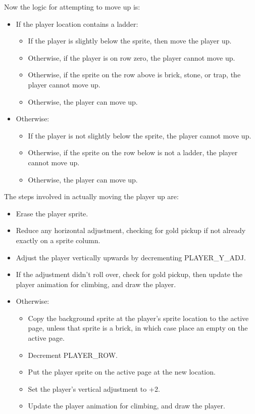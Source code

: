 \documentclass[10pt]{report}
\begin{document}
Now the logic for attempting to move up is:

\begin{itemize}
  \item If the player location contains a ladder:
  \begin{itemize}
    \item If the player is slightly below the sprite, then move the player up.
    \item Otherwise, if the player is on row zero, the player cannot move up.
    \item Otherwise, if the sprite on the row above is brick, stone, or trap,
          the player cannot move up.
    \item Otherwise, the player can move up.
  \end{itemize}
  \item Otherwise:
  \begin{itemize}
    \item If the player is not slightly below the sprite, the player cannot move up.
    \item Otherwise, if the sprite on the row below is not a ladder, the player cannot move up.
    \item Otherwise, the player can move up.
  \end{itemize}
\end{itemize}

The steps involved in actually moving the player up are:

\begin{itemize}
    \item Erase the player sprite.
    \item Reduce any horizontal adjustment, checking for gold pickup if not already exactly on a sprite column.
    \item Adjust the player vertically upwards by decrementing {\Tt{}PLAYER{\_}Y{\_}ADJ\nwendquote}.
    \item If the adjustment didn't roll over, check for gold pickup, then update
          the player animation for climbing, and draw the player.
    \item Otherwise:
    \begin{itemize}
        \item Copy the background sprite at the player's sprite location to the active page, unless
              that sprite is a brick, in which case place an empty on the active page.
        \item Decrement {\Tt{}PLAYER{\_}ROW\nwendquote}.
        \item Put the player sprite on the active page at the new location.
        \item Set the player's vertical adjustment to {\Tt{}+2\nwendquote}.
        \item Update the player animation for climbing, and draw the player.
    \end{itemize}
\end{itemize}
\end{document}

